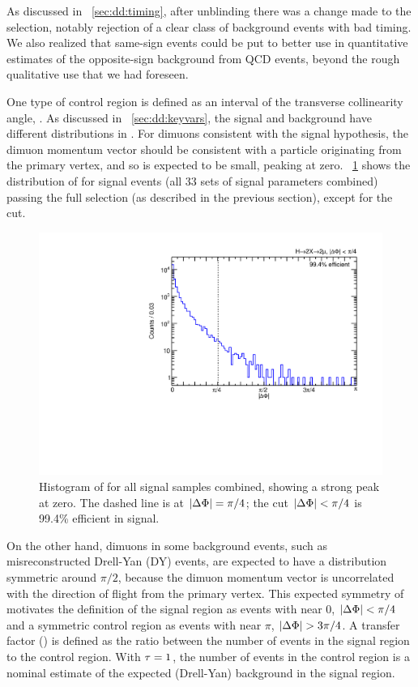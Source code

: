As discussed in \Sec~\ref{sec:dd:timing}, after unblinding there was a change made to the selection, notably rejection of a clear class of background events with bad timing.
We also realized that same-sign events could be put to better use in quantitative estimates of the opposite-sign background from QCD events, beyond the rough qualitative use that we had foreseen.

One type of control region is defined as an interval of the transverse collinearity angle, \DeltaPhi.
As discussed in \Sec~\ref{sec:dd:keyvars}, the signal and background have different distributions in \DeltaPhi.
For dimuons consistent with the signal hypothesis, the dimuon momentum vector should be consistent with a particle originating from the primary vertex, and so \DeltaPhi is expected to be small, peaking at zero.
\Fig~\ref{fig:dd:deltaPhi_Sig} shows the distribution of \DeltaPhi for \twoMu signal events (all 33 sets of signal parameters combined) passing the full selection (as described in the previous section), except for the \DeltaPhi cut.

\begin{figure}[htpb]
  \centering
  \includegraphics[width=\DFigWidth]{figures/displaced/NM1_2Mu2J_deltaPhi.pdf}
  \caption[Histogram of \DeltaPhi for all \twoMu simulated signal samples combined, showing a strong peak at zero.]{Histogram of \DeltaPhi for all \twoMu signal samples combined, showing a strong peak at zero. The dashed line is at $|\Delta\Phi| = \pi/4$; the cut $|\Delta\Phi| < \pi/4$ is 99.4\% efficient in signal.}
  \label{fig:dd:deltaPhi_Sig}
\end{figure}

On the other hand, dimuons in some background events, such as misreconstructed Drell-Yan (DY) events, are expected to have a \DeltaPhi distribution symmetric around $\pi/2$, because the dimuon momentum vector is uncorrelated with the direction of flight from the primary vertex.
This expected symmetry of \DeltaPhi motivates the definition of the signal region as events with \DeltaPhi near 0, \ie $|\Delta\Phi| < \pi/4$ and a symmetric control region as events with \DeltaPhi near $\pi$, \ie $|\Delta\Phi| > 3\pi/4$.
A transfer factor (\TF) is defined as the ratio between the number of events in the signal region to the control region.
With $\tau = 1$, the number of events in the control region is a nominal estimate of the expected (Drell-Yan) background in the signal region.

